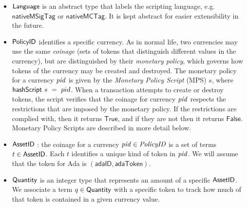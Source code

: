 \begin{itemize}

  \item $\mathsf{Language}$ is an abstract type that labels the scripting language, e.g.
    $\mathsf{nativeMSigTag}$ or $\mathsf{nativeMCTag}$. It is kept abstract for easier extensibility in the future.

  \item $\mathsf{PolicyID}$ identifies a specific currency.  As in normal life, two
    currencies may use the same \emph{coinage} (sets of tokens that distinguish different values in the currency),
    but are distinguished by their \emph{monetary policy}, which governs how tokens of the currency may be created
    and destroyed.
    The monetary policy for a currency $\mathit{pid}$ is given by the \emph{Monetary Policy Script}
    (MPS) $s$, where $\mathsf{hashScript}~s~=~pid$. When a transaction attempts to create or destroy tokens,
    the script verifies that the coinage for currency $\mathit{pid}$
    respects the restrictions that are imposed by the
    monetary policy. If the restrictions are complied with, then it returns
    $\mathsf{True}$, and if they are not then it returns
    $\mathsf{False}$.  Monetary Policy Scripts are described in more detail below.



  \item $\mathsf{AssetID}$ : the coinage for a currency $\mathit{pid} \in \mathit{PolicyID}$ is a set of terms
    $t\in\mathsf{AssetID}$.  Each $t$ identifies a unique kind of token in $\mathit{pid}$.
    We will assume that the token for Ada is $(\mathsf{adaID}, \mathsf{adaToken})$.

  \item $\mathsf{Quantity}$ is an integer type that represents an amount of a specific $\mathsf{AssetID}$. We associate
    a term $q\in\mathsf{Quantity}$ with a specific token to track how much of that token is contained in a given currency value.


\end{itemize}
